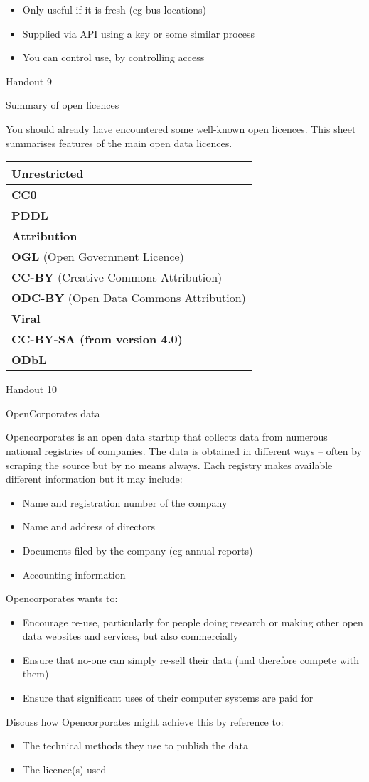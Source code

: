 \begin{itemize}
\item
  Only useful if it is fresh (eg bus locations)
\item
  Supplied via API using a key or some similar process
\item
  You can control use, by controlling access
\end{itemize}

Handout 9

Summary of open licences

You should already have encountered some well-known open licences. This
sheet summarises features of the main open data licences.

\begin{longtable}[c]{@{}l@{}}
\toprule
\textbf{Unrestricted}\tabularnewline
\midrule
\endhead
\textbf{CC0}\tabularnewline
\textbf{PDDL}\tabularnewline
\textbf{Attribution}\tabularnewline
\textbf{OGL} (Open Government Licence)\tabularnewline
\textbf{CC-BY} (Creative Commons Attribution)\tabularnewline
\textbf{ODC-BY} (Open Data Commons Attribution)\tabularnewline
\textbf{Viral}\tabularnewline
\textbf{CC-BY-SA (from version 4.0)}\tabularnewline
\textbf{ODbL}\tabularnewline
\bottomrule
\end{longtable}

Handout 10

OpenCorporates data

Opencorporates is an open data startup that collects data from numerous
national registries of companies. The data is obtained in different ways
-- often by scraping the source but by no means always. Each registry
makes available different information but it may include:

\begin{itemize}
\item
  Name and registration number of the company
\item
  Name and address of directors
\item
  Documents filed by the company (eg annual reports)
\item
  Accounting information
\end{itemize}

Opencorporates wants to:

\begin{itemize}
\item
  Encourage re-use, particularly for people doing research or making
  other open data websites and services, but also commercially
\item
  Ensure that no-one can simply re-sell their data (and therefore
  compete with them)
\item
  Ensure that significant uses of their computer systems are paid for
\end{itemize}

Discuss how Opencorporates might achieve this by reference to:

\begin{itemize}
\item
  The technical methods they use to publish the data
\item
  The licence(s) used
\end{itemize}
